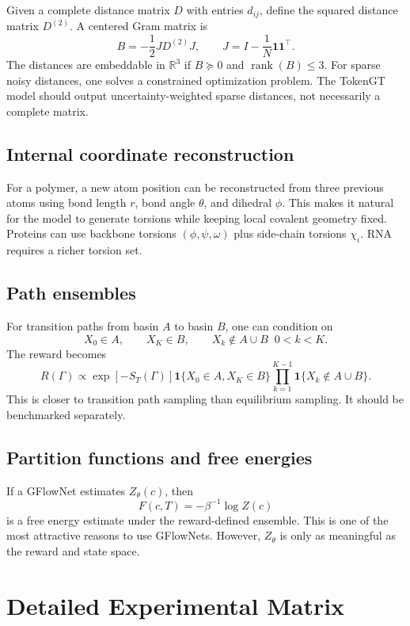 \documentclass[11pt]{article}
\newcommand{\R}{\mathbb{R}}
\begin{document}
Given a complete distance matrix $D$ with entries $d_{ij}$, define the squared distance matrix $D^{(2)}$. A centered Gram matrix is
\[
B=-\frac{1}{2}JD^{(2)}J,
\qquad
J=I-\frac{1}{N}\mathbf{1}\mathbf{1}^\top.
\]
The distances are embeddable in $\R^3$ if $B\succeq 0$ and $\operatorname{rank}(B)\le 3$. For sparse noisy distances, one solves a constrained optimization problem. The TokenGT model should output uncertainty-weighted sparse distances, not necessarily a complete matrix.

\subsection{Internal coordinate reconstruction}

For a polymer, a new atom position can be reconstructed from three previous atoms using bond length $r$, bond angle $\theta$, and dihedral $\phi$. This makes it natural for the model to generate torsions while keeping local covalent geometry fixed. Proteins can use backbone torsions $(\phi,\psi,\omega)$ plus side-chain torsions $\chi_i$. RNA requires a richer torsion set.

\subsection{Path ensembles}

For transition paths from basin $A$ to basin $B$, one can condition on
\[
X_0\in A,\qquad X_K\in B,\qquad X_k\notin A\cup B\;\;0<k<K.
\]
The reward becomes
\[
R(\Gamma)\propto
\exp[-S_T(\Gamma)]
\mathbf{1}\{X_0\in A,X_K\in B\}
\prod_{k=1}^{K-1}\mathbf{1}\{X_k\notin A\cup B\}.
\]
This is closer to transition path sampling than equilibrium sampling. It should be benchmarked separately.

\subsection{Partition functions and free energies}

If a GFlowNet estimates $Z_\theta(c)$, then
\[
F(c,T)=-\beta^{-1}\log Z(c)
\]
is a free energy estimate under the reward-defined ensemble. This is one of the most attractive reasons to use GFlowNets. However, $Z_\theta$ is only as meaningful as the reward and state space.

\section{Detailed Experimental Matrix}
\end{document}
